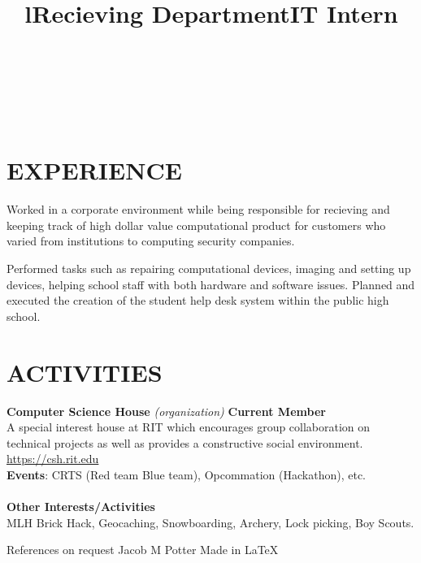 \documentclass[line,margin]{res}
\begin{document}
\begin{resume}
\begin{format}
\title{l}\\
\\
\body\\
\end{format}
\section{EXPERIENCE}
\title{\textbf{Recieving Department}}
\begin{position}
    Worked in a corporate environment while being responsible for recieving and 
    keeping track of high dollar value computational product for customers who 
    varied from institutions to computing security companies.
\end{position}
\title{\textbf{IT Intern}}
\begin{position}
    Performed tasks such as repairing computational devices, imaging and setting
    up devices, helping school staff with both hardware and software issues. 
    Planned and executed the creation of the student help desk system within the 
    public high school.
\end{position}

\section{ACTIVITIES}
\textbf{Computer Science House }{\sl (organization)}\hfill
    \textbf{Current Member}\\
A special interest house at RIT which encourages group 
collaboration on technical projects as well as provides a constructive social
environment. \href{https://csh.rit.edu}{https://csh.rit.edu}\\\textbf{Events}: 
CRTS (Red team Blue team), Opcommation (Hackathon), etc.\\\\
\textbf{Other Interests/Activities}\\
MLH Brick Hack, Geocaching, Snowboarding, Archery, Lock picking, Boy Scouts.

\end{resume}

\scriptsize{References on request} \hfill 
\scriptsize{Jacob M Potter} \hfill 
\scriptsize{Made in }\tiny{\LaTeX}
\end{document}
